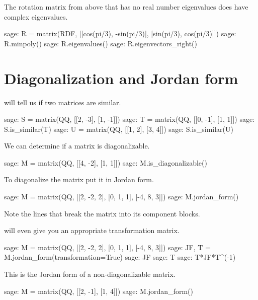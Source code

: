 The rotation matrix from above that has no real number eigenvalues does have 
complex eigenvalues.
\begin{sagecommandline}
sage: R = matrix(RDF, [[cos(pi/3), -sin(pi/3)], [sin(pi/3), cos(pi/3)]])
sage: R.minpoly()
sage: R.eigenvalues()
sage: R.eigenvectors_right()
\end{sagecommandline}




\section{Diagonalization and Jordan form}

\Sage{} will tell us if two matrices are similar.
\begin{sagecommandline}
sage: S =  matrix(QQ, [[2, -3], [1, -1]]) 
sage: T =  matrix(QQ, [[0, -1], [1,  1]]) 
sage: S.is_similar(T)
sage: U =  matrix(QQ, [[1, 2], [3,  4]]) 
sage: S.is_similar(U)
\end{sagecommandline}
\noindent

We can determine if a matrix is diagonalizable.
\begin{sagecommandline}
sage: M =  matrix(QQ, [[4, -2], [1, 1]])  
sage: M.is_diagonalizable()
\end{sagecommandline}
\noindent
To diagonalize the matrix put it in Jordan form.
\begin{sagecommandline}
sage: M =  matrix(QQ, [[2, -2, 2], [0, 1, 1], [-4, 8, 3]])  
sage: M.jordan_form()
\end{sagecommandline}
\noindent 
Note the \inlinecode{-+-+-} lines that break the matrix into its component
blocks.

\Sage{} will even give you an appropriate transformation matrix.
\begin{sagecommandline}[d,0,1]
sage: M =  matrix(QQ, [[2, -2, 2], [0, 1, 1], [-4, 8, 3]])  
sage: JF, T = M.jordan_form(transformation=True)
sage: JF
sage: T
sage: T*JF*T^(-1)
\end{sagecommandline}

This is the Jordan form of a non-diagonalizable matrix.
\begin{sagecommandline}
sage: M =  matrix(QQ, [[2, -1], [1, 4]])  
sage: M.jordan_form()
\end{sagecommandline}



